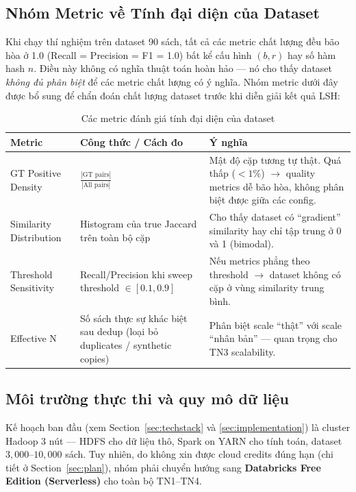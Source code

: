 \subsection{Nhóm Metric về Tính đại diện của Dataset}

Khi chạy thí nghiệm trên dataset 90 sách, tất cả các metric chất lượng đều bão hòa ở 1.0 (Recall = Precision = F1 = 1.0) bất kể cấu hình $(b, r)$ hay số hàm hash $n$. Điều này không có nghĩa thuật toán hoàn hảo --- nó cho thấy dataset \emph{không đủ phân biệt} để các metric chất lượng có ý nghĩa. Nhóm metric dưới đây được bổ sung để chẩn đoán chất lượng dataset trước khi diễn giải kết quả LSH:

\begin{table}[H]
\centering
\caption{Các metric đánh giá tính đại diện của dataset}
\label{tab:dataset-metrics}
\begin{tabularx}{\textwidth}{|l|X|X|}
\hline
\textbf{Metric} & \textbf{Công thức / Cách đo} & \textbf{Ý nghĩa} \\
\hline
GT Positive Density & $\frac{|\text{GT pairs}|}{|\text{All pairs}|}$ & Mật độ cặp tương tự thật. Quá thấp ($< 1\%$) $\rightarrow$ quality metrics dễ bão hòa, không phân biệt được giữa các config. \\
\hline
Similarity Distribution & Histogram của true Jaccard trên toàn bộ cặp & Cho thấy dataset có ``gradient'' similarity hay chỉ tập trung ở 0 và 1 (bimodal). \\
\hline
Threshold Sensitivity & Recall/Precision khi sweep threshold $\in [0.1, 0.9]$ & Nếu metrics phẳng theo threshold $\rightarrow$ dataset không có cặp ở vùng similarity trung bình. \\
\hline
Effective N & Số sách thực sự khác biệt sau dedup (loại bỏ duplicates / synthetic copies) & Phân biệt scale ``thật'' với scale ``nhân bản'' --- quan trọng cho TN3 scalability. \\
\hline
\end{tabularx}
\end{table}

\subsection{Môi trường thực thi và quy mô dữ liệu}
\label{subsec:env-pivot}

Kế hoạch ban đầu (xem Section~\ref{sec:techstack} và \ref{sec:implementation}) là cluster Hadoop 3 nút --- HDFS cho dữ liệu thô, Spark on YARN cho tính toán, dataset $3{,}000$--$10{,}000$ sách. Tuy nhiên, do không xin được cloud credits đúng hạn (chi tiết ở Section~\ref{sec:plan}), nhóm phải chuyển hướng sang \textbf{Databricks Free Edition (Serverless)} cho toàn bộ TN1--TN4.

